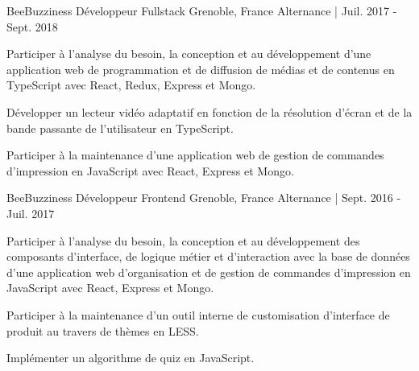 \begin{cventries}
  \cventry
  	{BeeBuzziness} %
    {Développeur Fullstack} %
    {Grenoble, France} %
    {Alternance | Juil. 2017 - Sept. 2018} %
    {
      \begin{cvitems} %
      \item {Participer à l’analyse du besoin, la conception et au développement d’une application web de programmation et de diffusion de médias et de contenus en TypeScript avec React, Redux, Express et Mongo.}
        \item {Développer un lecteur vidéo adaptatif en fonction de la résolution d'écran et de la bande passante de l'utilisateur en TypeScript.}
        \item {Participer à la maintenance d’une application web de gestion de commandes d'impression en JavaScript avec React, Express et Mongo.}
      \end{cvitems}
    }

  \cventry
  	{BeeBuzziness} %
    {Développeur Frontend} %
    {Grenoble, France} %
    {Alternance | Sept. 2016 - Juil. 2017} %
    {
      \begin{cvitems} %
        \item {Participer à l’analyse du besoin, la conception et au développement des composants d’interface, de logique métier et d’interaction avec la base de données d'une application web d'organisation et de gestion de commandes d'impression en JavaScript avec React, Express et Mongo.}
        \item {Participer à la maintenance d’un outil interne de customisation d’interface de produit au travers de thèmes en LESS.}
        \item {Implémenter un algorithme de quiz en JavaScript.}
      \end{cvitems}
    }

\end{cventries}
